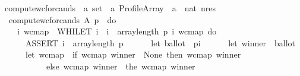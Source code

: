 \begin{isabellebody}
\isanewline
\isanewline
\isanewline
{}\isamarkupfalse%
\ computewcforcands\ {\isacharcolon}{\kern0pt}{\isacharcolon}{\kern0pt}\ {\isachardoublequoteopen}{\isacharprime}{\kern0pt}a\ set\ {\isasymRightarrow}\ {\isacharprime}{\kern0pt}a\ Profile{\isacharunderscore}{\kern0pt}Array\ {\isasymRightarrow}\ {\isacharparenleft}{\kern0pt}{\isacharprime}{\kern0pt}a\ {\isasymrightharpoonup}\ nat{\isacharparenright}{\kern0pt}\ nres{\isachardoublequoteclose}\ \isanewline
\ \ {\isachardoublequoteopen}computewcforcands\ A\ p\ {\isasymequiv}\ do\ {\isacharbraceleft}{\kern0pt}\ \ \ \ \ \ \ \ \ \ \ \ \ \ \ \isanewline
\ \ \ \ {\isacharparenleft}{\kern0pt}i{\isacharcomma}{\kern0pt}\ wcmap{\isacharparenright}{\kern0pt}\ {\isasymleftarrow}\ WHILET\ {\isacharparenleft}{\kern0pt}{\isasymlambda}{\isacharparenleft}{\kern0pt}i{\isacharcomma}{\kern0pt}\ {\isacharunderscore}{\kern0pt}{\isacharparenright}{\kern0pt}{\isachardot}{\kern0pt}\ i\ {\isacharless}{\kern0pt}\ array{\isacharunderscore}{\kern0pt}length\ p{\isacharparenright}{\kern0pt}\ {\isacharparenleft}{\kern0pt}{\isasymlambda}{\isacharparenleft}{\kern0pt}i{\isacharcomma}{\kern0pt}\ wcmap{\isacharparenright}{\kern0pt}{\isachardot}{\kern0pt}\ do\ {\isacharbraceleft}{\kern0pt}\isanewline
\ \ \ \ \ \ ASSERT\ {\isacharparenleft}{\kern0pt}i\ {\isacharless}{\kern0pt}\ array{\isacharunderscore}{\kern0pt}length\ p{\isacharparenright}{\kern0pt}{\isacharsemicolon}{\kern0pt}\isanewline
\ \ \ \ \ \ let\ ballot\ {\isacharequal}{\kern0pt}\ {\isacharparenleft}{\kern0pt}p{\isacharbrackleft}{\kern0pt}{\isacharbrackleft}{\kern0pt}i{\isacharbrackright}{\kern0pt}{\isacharbrackright}{\kern0pt}{\isacharparenright}{\kern0pt}{\isacharsemicolon}{\kern0pt}\isanewline
\ \ \ \ \ \ let\ winner\ {\isacharequal}{\kern0pt}\ {\isacharparenleft}{\kern0pt}ballot{\isacharbrackleft}{\kern0pt}{\isacharbrackleft}{\kern0pt}{}{\isacharbrackright}{\kern0pt}{\isacharbrackright}{\kern0pt}{\isacharparenright}{\kern0pt}{\isacharsemicolon}{\kern0pt}\isanewline
\ \ \ \ \ \ let\ wcmap\ {\isacharequal}{\kern0pt}\ {\isacharparenleft}{\kern0pt}if\ {\isacharparenleft}{\kern0pt}wcmap\ winner\ {\isacharequal}{\kern0pt}\ None{\isacharparenright}{\kern0pt}\ then\ wcmap\ {\isacharparenleft}{\kern0pt}winner\ {\isasymmapsto}\ {}{\isacharparenright}{\kern0pt}\isanewline
\ \ \ \ \ \ \ \ \ \ \ else\ wcmap\ {\isacharparenleft}{\kern0pt}winner\ {\isasymmapsto}\ {\isacharparenleft}{\kern0pt}the\ {\isacharparenleft}{\kern0pt}wcmap\ winner{\isacharparenright}{\kern0pt}\ {\isacharplus}{\kern0pt}\ {}{\isacharparenright}{\kern0pt}{\isacharparenright}{\kern0pt}{\isacharparenright}{\kern0pt}{\isacharsemicolon}{\kern0pt}\isanewline

\end{isabellebody}
